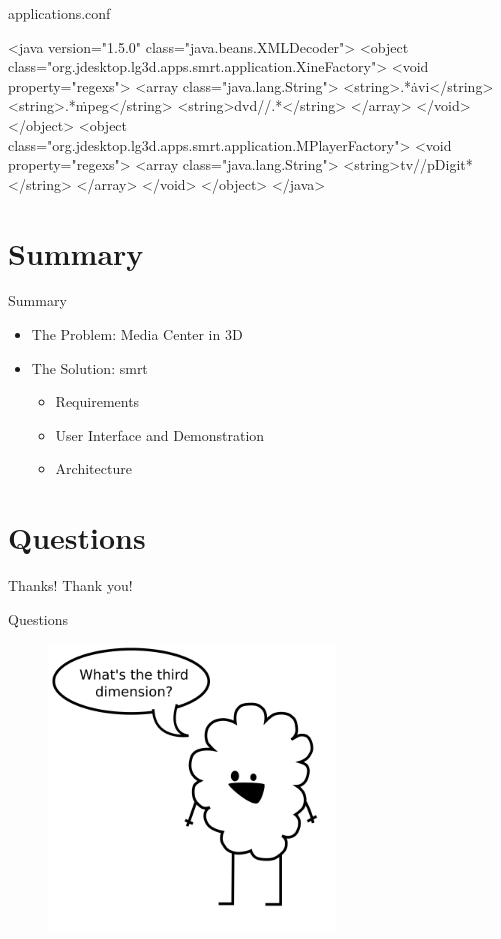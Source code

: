 \documentclass[style=smrt,mode=present,paper=screen]{powerdot}
\begin{document}
\begin{slide}[method=direct]{applications.conf}
\begin{code}
<java version="1.5.0" class="java.beans.XMLDecoder">
  <object class="org.jdesktop.lg3d.apps.smrt.application.XineFactory">
    <void property="regexs">
      <array class="java.lang.String">
        <string>.*\.avi</string>
        <string>.*\.mpeg</string>
        <string>dvd\://.*</string>
      </array>
    </void>
  </object>
  <object class="org.jdesktop.lg3d.apps.smrt.application.MPlayerFactory">
    <void property="regexs">
      <array class="java.lang.String">
        <string>tv\://p{Digit}*</string>
      </array>
    </void>
  </object>
</java>
\end{code}
\end{slide}


\section[slide=false]{Summary}
\begin{slide}[toc=,bm=]{Summary}
\begin{itemize}
\item The Problem: Media Center in 3D
\item The Solution: smrt \\
\begin{itemize}
	\item Requirements
	\item User Interface and Demonstration
	\item Architecture
\end{itemize}
\end{itemize}
\end{slide}

\presenter{}
\section[slide=false]{Questions}
\begin{slide}[toc=,bm=]{Thanks!}
Thank you!
\end{slide}

\begin{slide}[toc=,bm=]{Questions}
\begin{figure}[htb]
	\includegraphics[width=3in]{../lib/figures/fishstick}
\end{figure}
\end{slide}
\end{document}
